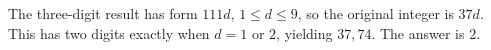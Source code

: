 The three-digit result has form $111d$, $1\le d\le9$, so the original integer is $37d$. This has two digits exactly when $d=1$ or $2$, yielding $37,74$. The answer is $\boxed2$.
